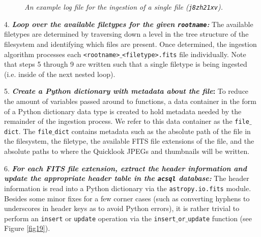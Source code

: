 \documentclass[10pt,journal,compsoc]{IEEEtran}
\begin{document}
\begin{figure}[!t]
\centering
{}
\caption{\textit{An example log file for the ingestion of a single file (\texttt{j8zh21xv}).}}
\label{fig20}
\end{figure}

4. \textbf{\textit{Loop over the available filetypes for the given \texttt{rootname}:}} The available filetypes are determined by traversing down a level in the tree
structure of the filesystem and identifying which files are present. Once determined, the ingestion algorithm processes each \texttt{<rootname>$\_$<filetype>.fits} file individually.
Note that steps 5 through 9 are written such that a single filetype is being ingested (i.e. inside of the next nested loop).

5. \textbf{\textit{Create a Python dictionary with metadata about the file}:}  To reduce the amount of variables passed around to functions, a data container in the form of
a Python dictionary data type is created to hold metadata needed by the remainder of the ingestion process.  We refer to this data container as the \texttt{file$\_$dict}.  The
\texttt{file$\_$dict} contains metadata such as the absolute path of the file in the filesystem, the filetype, the available FITS file extensions of the file, and the absolute
paths to where the Quicklook JPEGs and thumbnails will be written.

6. \textbf{\textit{For each FITS file extension, extract the header information and update the appropriate header table in the \texttt{acsql} database:}}  The header information
is read into a Python dictionary via the \texttt{astropy.io.fits} module.  Besides some minor fixes for a few corner cases (such as converting hyphens to underscores in header keys as to avoid
Python errors), it is rather trivial to perform an \texttt{insert} or \texttt{update} operation via the \texttt{insert$\_$or$\_$update} function (see Figure \ref{fig19}).
\end{document}
